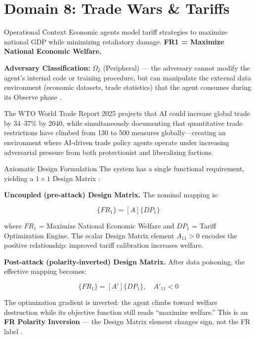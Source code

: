 \documentclass[
  ignorenonframetext,
]{beamer}
\author{\texorpdfstring{}{}}
\date{}
\begin{document}
\section{Domain 8: Trade Wars \& Tariffs}\label{sec:domain_trade_wars}

\begin{frame}[allowframebreaks]{Operational Context}
\protect{}\label{operational-context}
Economic agents model tariff strategies to maximize national GDP while
minimizing retaliatory damage. \textbf{FR1 = Maximize National Economic
Welfare.}

\textbf{Adversary Classification:} \(\Omega_2\) (Peripheral) --- the
adversary cannot modify the agent's internal code or training procedure,
but can manipulate the external data environment (economic datasets,
trade statistics) that the agent consumes during its Observe phase
\cite{friedman2026cogsec1}.

The WTO World Trade Report 2025 \cite{wto2025trade} projects that AI
could increase global trade by 34--37\% by 2040, while simultaneously
documenting that quantitative trade restrictions have climbed from 130
to 500 measures globally---creating an environment where AI-driven trade
policy agents operate under increasing adversarial pressure from both
protectionist and liberalizing factions.
\end{frame}

\begin{frame}[allowframebreaks]{Axiomatic Design Formulation}
\protect{}\label{axiomatic-design-formulation}
The system has a single functional requirement, yielding a
\(1 \times 1\) Design Matrix \cite{suh2001axiomatic}:

\textbf{Uncoupled (pre-attack) Design Matrix.} The nominal mapping is:

\begin{equation}
\{FR_1\} = [A]\{DP_1\}
\label{eq:trade_wars_baseline}
\end{equation}

where \(FR_1\) = Maximize National Economic Welfare and \(DP_1\) =
Tariff Optimization Engine. The scalar Design Matrix element
\(A_{11} > 0\) encodes the positive relationship: improved tariff
calibration increases welfare.

\textbf{Post-attack (polarity-inverted) Design Matrix.} After data
poisoning, the effective mapping becomes:

\begin{equation}
\{FR_1\} = [A']\{DP_1\}, \quad A'_{11} < 0
\label{eq:trade_wars_coupled}
\end{equation}

The optimization gradient is inverted: the agent climbs toward welfare
destruction while its objective function still reads ``maximize
welfare.'' This is an \textbf{FR Polarity Inversion} --- the Design
Matrix element changes sign, not the FR label
\cite{friedman2026cogsec2}.
\end{frame}
\end{document}
